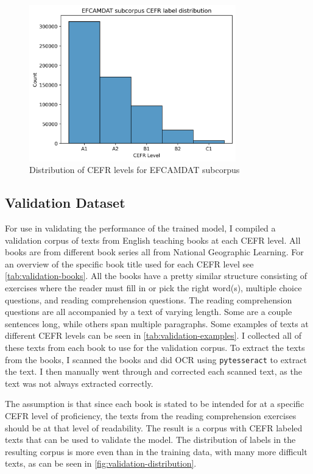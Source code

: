\documentclass[11pt,a4paper]{article}
\begin{document}
\begin{figure}
  \centering
  \includegraphics[width=0.8\textwidth]{figures/cefr-distribution-efcamdat.png}
  \caption{Distribution of CEFR levels for EFCAMDAT subcorpus}
  \label{fig:efcamdat-distribution}
\end{figure}

\subsection{Validation Dataset}

For use in validating the performance of the trained model, I compiled a
validation corpus of texts from English teaching books at each CEFR level.
All books are from different book series all from National Geographic Learning.
For an overview of the specific book title used for each CEFR level see
\autoref{tab:validation-books}. All the books have a pretty similar structure
consisting of exercises where the reader must fill in or pick the right
word(s), multiple choice questions, and reading comprehension questions. The
reading comprehension questions are all accompanied by a text of varying
length. Some are a couple sentences long, while others span multiple
paragraphs. Some examples of texts at different CEFR levels can be seen in
\autoref{tab:validation-examples}. I collected all of these texts from each book to use for the
validation corpus. To extract the texts from the books, I scanned the books and
did OCR using \verb!pytesseract! to
extract the text. I then manually went through and corrected each scanned text,
as the text was not always extracted correctly.

The assumption is that since each book is stated to be
intended for at a specific CEFR level of proficiency, the texts from the
reading comprehension exercises should be at that level of readability. The
result is a corpus with CEFR labeled texts that can be used to validate the
model. The distribution of labels in the resulting corpus is more even than in
the training data, with many more difficult texts, as can be seen in
\autoref{fig:validation-distribution}.
\end{document}
